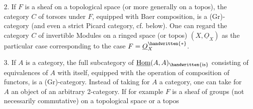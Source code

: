  2. If $F$ is a sheaf on a topological space (or more generally on a topos), the category $C$ of torsors under $F$, equipped with Baer composition, is a (Gr)-category (and even a strict Picard category, cf. below). One can regard the category $C$ of invertible Modules on a  ringed space (or topos)  $(X,\underline{O}_{X})$ as the particular case corresponding to the case $F=\underline{O}_{X}^{\handwritten{*}}$.

 3. If $A$ is a category, the full subcategory  of $\underline{\mathrm{Hom}}(A,A)_{\handwritten{\mathrm{is}}}$ consisting of equivalences of $A$ with itself, equipped with the operation of composition of functors, is a (Gr)-category. Instead of taking for $A$ a category, one can  take for $A$ an object of an arbitrary 2-category. If for example $F$ is a sheaf of groups (not necessarily commutative) on a topological space \handwritten{(}or a topos\handwritten{)}\handwritten{,}
